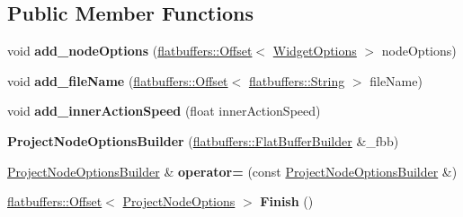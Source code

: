 \subsection*{Public Member Functions}
\begin{DoxyCompactItemize}
\item 
\mbox{\label{structflatbuffers_1_1ProjectNodeOptionsBuilder_a219fcc1108391be5e42b7543a0bf382e}} 
void {\bfseries add\+\_\+node\+Options} (\hyperlink{structflatbuffers_1_1Offset}{flatbuffers\+::\+Offset}$<$ \hyperlink{structflatbuffers_1_1WidgetOptions}{Widget\+Options} $>$ node\+Options)
\item 
\mbox{\label{structflatbuffers_1_1ProjectNodeOptionsBuilder_a81700b7e16b41ef0d24ee2ad4e6c81eb}} 
void {\bfseries add\+\_\+file\+Name} (\hyperlink{structflatbuffers_1_1Offset}{flatbuffers\+::\+Offset}$<$ \hyperlink{structflatbuffers_1_1String}{flatbuffers\+::\+String} $>$ file\+Name)
\item 
\mbox{\label{structflatbuffers_1_1ProjectNodeOptionsBuilder_a8a5e4ce8f1fa7ec1e723ba2b5fad136f}} 
void {\bfseries add\+\_\+inner\+Action\+Speed} (float inner\+Action\+Speed)
\item 
\mbox{\label{structflatbuffers_1_1ProjectNodeOptionsBuilder_a4ac8fcf52106ac7da325a8451ba8765d}} 
{\bfseries Project\+Node\+Options\+Builder} (\hyperlink{classflatbuffers_1_1FlatBufferBuilder}{flatbuffers\+::\+Flat\+Buffer\+Builder} \&\+\_\+fbb)
\item 
\mbox{\label{structflatbuffers_1_1ProjectNodeOptionsBuilder_abbf21da22a62794182e737bf593b0c35}} 
\hyperlink{structflatbuffers_1_1ProjectNodeOptionsBuilder}{Project\+Node\+Options\+Builder} \& {\bfseries operator=} (const \hyperlink{structflatbuffers_1_1ProjectNodeOptionsBuilder}{Project\+Node\+Options\+Builder} \&)
\item 
\mbox{\label{structflatbuffers_1_1ProjectNodeOptionsBuilder_af459ddd1ba718391c3f227b664d3671a}} 
\hyperlink{structflatbuffers_1_1Offset}{flatbuffers\+::\+Offset}$<$ \hyperlink{structflatbuffers_1_1ProjectNodeOptions}{Project\+Node\+Options} $>$ {\bfseries Finish} ()

\end{DoxyCompactItemize}
